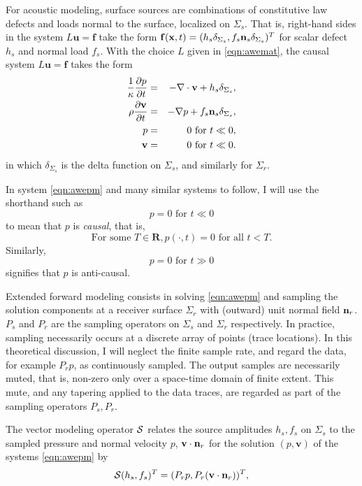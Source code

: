 \documentclass[12pt]{geophysics}
\newcommand{\bx}{\mathbf{x}}
\newcommand{\bv}{\mathbf{v}}
\newcommand{\bff}{\mathbf{f}}
\newcommand{\bu}{\mathbf{u}}
\newcommand{\bR}{\mathbf{R}}
\begin{document}
For
acoustic modeling, surface sources are combinations of constitutive law
defects and loads normal to the surface, localized on $\Sigma_s$. That
is, right-hand sides in the system $L\bu=\bff$ take the form
$\bff(\bx,t) = (h_s\delta_{\Sigma_s},
f_s{\bf n}_s\delta_{\Sigma_s})^T$ for scalar defect $h_s$ and normal
load $f_s$. With the choice $L$ given in
\ref{eqn:awemat}, the causal system $L\bu=\bff$
takes the form
\begin{eqnarray}
\label{eqn:awepm}
\frac{1}{\kappa}\frac{\partial p}{\partial t} & = & - \nabla \cdot \bv +
h_s \delta_{\Sigma_s}, \nonumber \\
\rho\frac{\partial \bv}{\partial t} & = & - \nabla p +
                                                f_s{\bf n}_s \delta_{\Sigma_s},\nonumber \\
p & =& 0 \mbox{ for }  t \ll 0,\nonumber\\ 
\bv & = & 0 \mbox{ for } t \ll 0.
\end{eqnarray}
in which $\delta_{\Sigma_s}$ is the delta function on $\Sigma_s$, and
similarly for $\Sigma_r$. 

 In system \ref{eqn:awepm} and many similar
systems to follow, I will use the shorthand such as
\[
  p = 0 \mbox{ for } t \ll 0 
\]
to mean that $p$ is {\em causal}, that is,
\[
  \mbox{For some } T \in \bR, p(\cdot,t) = 0 \mbox{ for all } t <
  T.
\]
Similarly,
\[
  p = 0 \mbox{ for } t \gg 0 
\]
signifies that $p$ is anti-causal.

Extended forward modeling consists in solving \ref{eqn:awepm} and
sampling the solution components at a receiver surface $\Sigma_r$ with
(outward) unit normal field ${\bf n}_r$.
$P_s$ and $P_r$ are the sampling operators on $\Sigma_s$ and
$\Sigma_r$ respectively. In
practice, sampling necessarily occurs at a discrete array of points
(trace locations). In this
theoretical discussion, I will neglect the finite sample rate, and
regard the data, for example $P_rp$, as continuously sampled. The
output samples are necessarily muted, that is, non-zero only over a space-time domain
of finite extent. This mute, and any tapering applied to the data
traces, are regarded as part of the sampling operators $P_s,P_r$.

The vector modeling operator ${\cal S}$ relates the source amplitudes
$h_s,f_s$ on $\Sigma_s$ to the sampled pressure and normal velocity
$p$, $\bv \cdot {\bf n}_r$ for 
the solution $(p,\bv)$ of the systems \ref{eqn:awepm} by
\begin{equation}
   {\cal S}(h_s,f_s)^T  = (P_rp,P_r(\bv \cdot {\bf n}_r) )^T,
  \label{eqn:fwd}
\end{equation}
\end{document}
